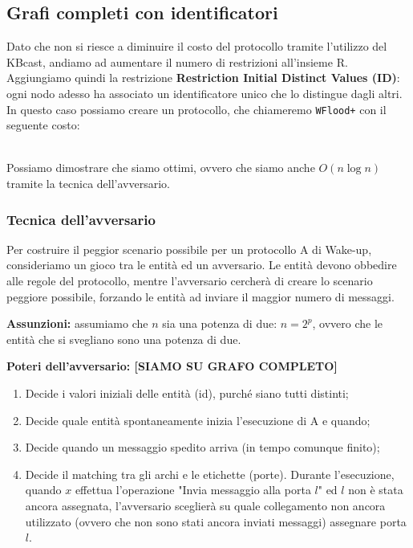 \subsection{Grafi completi con identificatori}
Dato che non si riesce a diminuire il costo del protocollo tramite l'utilizzo del KBcast, andiamo ad aumentare il numero di restrizioni all'insieme R. Aggiungiamo quindi la restrizione \textbf{Restriction Initial Distinct Values (ID)}: ogni nodo adesso ha associato un identificatore unico che lo distingue dagli altri.
In questo caso possiamo creare un protocollo, che chiameremo \texttt{WFlood+} con il seguente costo:


\\
Possiamo dimostrare che siamo ottimi, ovvero che siamo anche $O(n \log n)$ tramite la tecnica dell'avversario.

\subsubsection{Tecnica dell'avversario}
Per costruire il peggior scenario possibile per un protocollo A di Wake-up, consideriamo un gioco tra le entità ed un avversario. Le entità devono obbedire alle regole del protocollo, mentre l'avversario cercherà di creare lo scenario peggiore possibile, forzando le entità ad inviare il maggior numero di messaggi.

\textbf{Assunzioni:} assumiamo che $n$ sia una potenza di due: $n = 2^p$, ovvero che le entità che si svegliano sono una potenza di due.

\textbf{Poteri dell'avversario: [SIAMO SU GRAFO COMPLETO]}
\begin{enumerate}
  \item Decide i valori iniziali delle entità (id), purché siano tutti distinti;
  \item Decide quale entità spontaneamente inizia l'esecuzione di A e quando;
  \item Decide quando un messaggio spedito arriva (in tempo comunque finito);
  \item Decide il matching tra gli archi e le etichette (porte). Durante l'esecuzione, quando $x$ effettua l'operazione "Invia messaggio alla porta $l$" ed $l$ non è stata ancora assegnata, l'avversario sceglierà su quale collegamento non ancora utilizzato (ovvero che non sono stati ancora inviati messaggi) assegnare porta $l$.
\end{enumerate}

